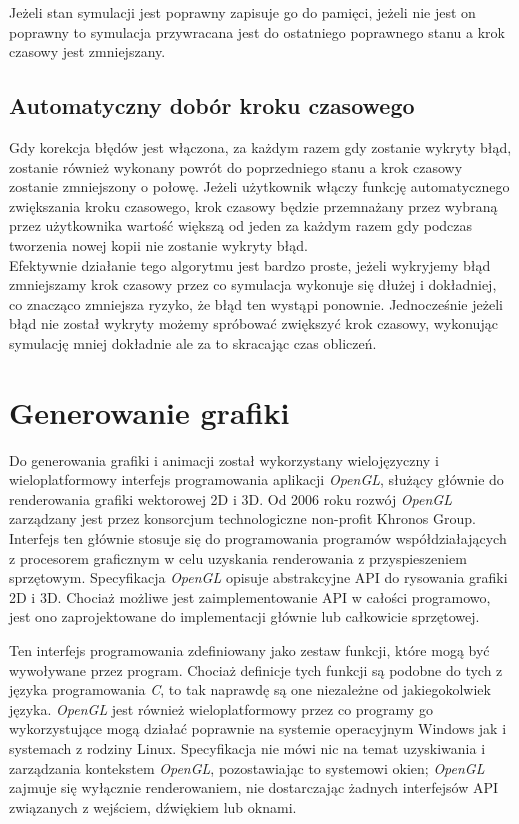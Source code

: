 \documentclass[12pt, letterpaper]{report}
\begin{document}
    Jeżeli stan symulacji jest poprawny zapisuje go do pamięci, jeżeli nie jest on poprawny to symulacja 
    przywracana jest do ostatniego poprawnego stanu a krok czasowy jest zmniejszany.

    \subsection{Automatyczny dobór kroku czasowego}
    Gdy korekcja błędów jest włączona, za każdym razem gdy zostanie wykryty błąd,
    zostanie również wykonany powrót do poprzedniego stanu a krok czasowy zostanie zmniejszony o połowę. 
    Jeżeli użytkownik włączy funkcję automatycznego zwiększania
    kroku czasowego, krok czasowy będzie przemnażany przez wybraną przez użytkownika wartość większą od 
    jeden za każdym razem gdy podczas tworzenia nowej kopii nie zostanie wykryty błąd. \\
    
    Efektywnie działanie tego algorytmu jest bardzo proste, jeżeli wykryjemy błąd zmniejszamy krok czasowy
    przez co symulacja wykonuje się dłużej i dokładniej, co znacząco zmniejsza ryzyko, że błąd
    ten wystąpi ponownie. Jednocześnie jeżeli błąd nie został wykryty możemy spróbować zwiększyć 
    krok czasowy, wykonując symulację mniej dokładnie ale za to skracając czas obliczeń.

    \clearpage
    \section{Generowanie grafiki}
    Do generowania grafiki i animacji został wykorzystany wielojęzyczny i wieloplatformowy 
    interfejs programowania aplikacji \emph{OpenGL}, służący głównie do 
    renderowania grafiki wektorowej 2D i 3D.
    Od 2006 roku rozwój \emph{OpenGL} zarządzany jest przez konsorcjum 
    technologiczne non-profit Khronos Group. 
    Interfejs ten głównie stosuje się do programowania programów współdziałających z 
    procesorem graficznym w celu uzyskania renderowania z przyspieszeniem sprzętowym. 
    Specyfikacja \emph{OpenGL} opisuje abstrakcyjne API do rysowania grafiki 2D i 3D. Chociaż możliwe jest 
    zaimplementowanie API w całości programowo, jest ono zaprojektowane do implementacji głównie 
    lub całkowicie sprzętowej.

    Ten interfejs programowania zdefiniowany jako zestaw funkcji, które mogą być wywoływane przez program.
    Chociaż definicje tych funkcji są podobne do tych z języka programowania \emph{C}, to tak 
    naprawdę są one niezależne od jakiegokolwiek języka. 
    \emph{OpenGL} jest również wieloplatformowy przez co programy go wykorzystujące mogą 
    działać poprawnie na systemie operacyjnym Windows jak i systemach z rodziny Linux. 
    Specyfikacja nie mówi nic na temat uzyskiwania i zarządzania kontekstem \emph{OpenGL}, 
    pozostawiając to systemowi okien; \emph{OpenGL} zajmuje się wyłącznie 
    renderowaniem, nie dostarczając żadnych interfejsów API związanych z wejściem, dźwiękiem lub oknami. \\
\end{document}
